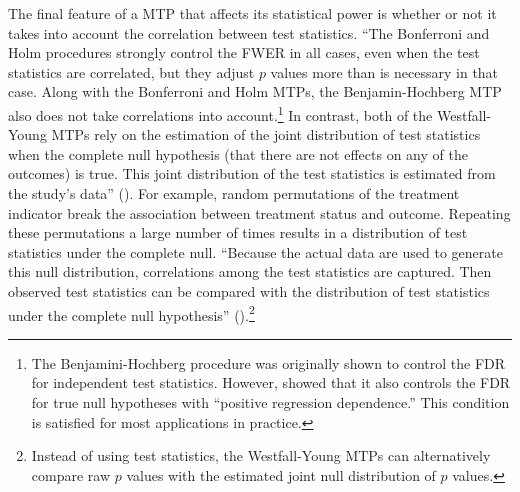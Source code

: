 \documentclass[
]{jss}
\begin{document}
The final feature of a MTP that affects its statistical power is whether
or not it takes into account the correlation between test statistics.
``The Bonferroni and Holm procedures strongly control the FWER in all
cases, even when the test statistics are correlated, but they adjust
\(p\) values more than is necessary in that case. Along with the
Bonferroni and Holm MTPs, the Benjamin-Hochberg MTP also does not take
correlations into account.\footnote{The Benjamini-Hochberg procedure was
  originally shown to control the FDR for independent test statistics.
  However, \citet{BenjaminiYekutieli2001} showed that it also controls
  the FDR for true null hypotheses with ``positive regression
  dependence.'' This condition is satisfied for most applications in
  practice.} In contrast, both of the Westfall-Young MTPs rely on the
estimation of the joint distribution of test statistics when the
complete null hypothesis (that there are not effects on any of the
outcomes) is true. This joint distribution of the test statistics is
estimated from the study's data'' (\citet{Porter2018}). For example,
random permutations of the treatment indicator break the association
between treatment status and outcome. Repeating these permutations a
large number of times results in a distribution of test statistics under
the complete null. ``Because the actual data are used to generate this
null distribution, correlations among the test statistics are captured.
Then observed test statistics can be compared with the distribution of
test statistics under the complete null hypothesis''
(\citet{Porter2018}).\footnote{Instead of using test statistics, the
  Westfall-Young MTPs can alternatively compare raw \(p\) values with
  the estimated joint null distribution of \(p\) values.}
\end{document}
